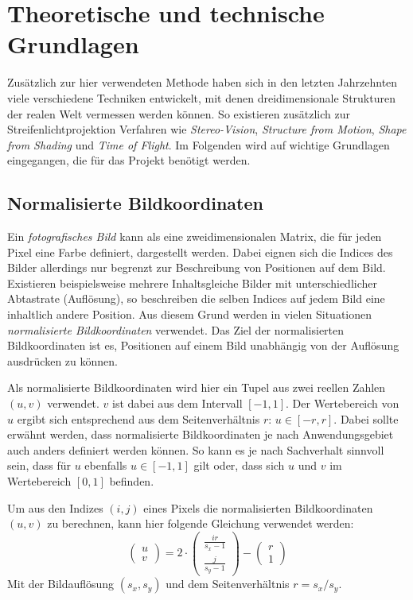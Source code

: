 \documentclass[ngerman,a4paper,parskip=half]{scrartcl}
\begin{document}

\section{Theoretische und technische Grundlagen}
\label{sec:basics}

Zusätzlich zur hier verwendeten Methode haben sich in den letzten Jahrzehnten viele verschiedene Techniken entwickelt, mit denen dreidimensionale Strukturen der realen Welt vermessen werden können. So existieren zusätzlich zur Streifenlichtprojektion Verfahren wie \emph{Stereo-Vision}, \emph{Structure from Motion}, \emph{Shape from Shading} und \emph{Time of Flight}. Im Folgenden wird auf wichtige Grundlagen eingegangen, die für das Projekt benötigt werden.

\subsection{Normalisierte Bildkoordinaten}
\label{sec:imagecoordinates}

Ein \emph{fotografisches Bild} kann als eine zweidimensionalen Matrix, die für jeden Pixel eine Farbe definiert, dargestellt werden. Dabei eignen sich die Indices des Bilder allerdings nur begrenzt zur Beschreibung von Positionen auf dem Bild. Existieren beispielsweise mehrere Inhaltsgleiche Bilder mit unterschiedlicher Abtastrate (Auflösung), so beschreiben die selben Indices auf jedem Bild eine inhaltlich andere Position. Aus diesem Grund werden in vielen Situationen \emph{normalisierte Bildkoordinaten} verwendet. Das Ziel der normalisierten Bildkoordinaten ist es, Positionen auf einem Bild unabhängig von der Auflösung ausdrücken zu können.

Als normalisierte Bildkoordinaten wird hier ein Tupel aus zwei reellen Zahlen $(u,v)$ verwendet. $v$ ist dabei aus dem Intervall $[-1,1]$. Der Wertebereich von $u$ ergibt sich entsprechend aus dem Seitenverhältnis $r$: $u \in [-r,r]$. Dabei sollte erwähnt werden, dass normalisierte Bildkoordinaten je nach Anwendungsgebiet auch anders definiert werden können. So kann es je nach Sachverhalt sinnvoll sein, dass für $u$ ebenfalls $u \in [-1,1]$ gilt oder, dass sich $u$ und $v$ im Wertebereich $[0,1]$ befinden.

Um aus den Indizes $(i,j)$ eines Pixels die normalisierten Bildkoordinaten $(u,v)$ zu berechnen, kann hier folgende Gleichung verwendet werden:
\[ \begin{pmatrix}
u \\ v
\end{pmatrix} = 2 \cdot \begin{pmatrix}
\frac{i r}{s_x - 1} \\
\frac{j}{s_y - 1}
\end{pmatrix} - \begin{pmatrix}
r \\ 1
\end{pmatrix} \]
Mit der Bildauflösung $(s_x, s_y)$ und dem Seitenverhältnis $r = s_x/s_y$.
\end{document}
